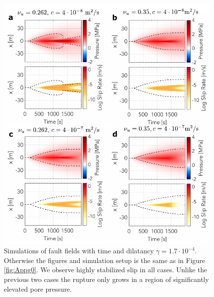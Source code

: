 \documentclass[draft]{agujournal2019}
\begin{document}
\begin{figure}[H]
\centering
\includegraphics[scale =  0.95]{Figures/gammanorm_comparison.pdf} %
\caption{Simulations of fault fields with time and dilatancy $\gamma = 1.7 \cdot 10^{-4}$. Otherwise the figures and simulation setup is the same as in Figure \ref{fig:Appg0}. We observe highly stabilized slip in all cases. Unlike the previous two cases the rupture only grows in a region of significantly elevated pore pressure. }
\label{fig:Appgn}
\end{figure}
\end{document}
